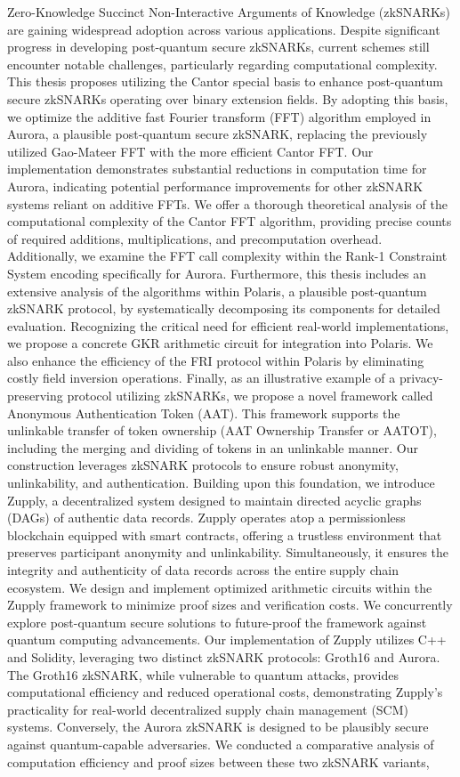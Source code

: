 Zero-Knowledge Succinct Non-Interactive Arguments of Knowledge (zkSNARKs) are gaining widespread adoption across various applications. Despite significant progress in developing post-quantum secure zkSNARKs, current schemes still encounter notable challenges, particularly regarding computational complexity.
This thesis proposes utilizing the Cantor special basis to enhance post-quantum secure zkSNARKs operating over binary extension fields. By adopting this basis, we optimize the additive fast Fourier transform (FFT) algorithm employed in Aurora, a plausible post-quantum secure zkSNARK, replacing the previously utilized Gao-Mateer FFT with the more efficient Cantor FFT. Our implementation demonstrates substantial reductions in computation time for Aurora, indicating potential performance improvements for other zkSNARK systems reliant on additive FFTs. We offer a thorough theoretical analysis of the computational complexity of the Cantor FFT algorithm, providing precise counts of required additions, multiplications, and precomputation overhead. Additionally, we examine the FFT call complexity within the Rank-1 Constraint System encoding specifically for Aurora.
Furthermore, this thesis includes an extensive analysis of the algorithms within Polaris, a plausible post-quantum zkSNARK protocol, by systematically decomposing its components for detailed evaluation. Recognizing the critical need for efficient real-world implementations, we propose a concrete GKR arithmetic circuit for integration into Polaris. We also enhance the efficiency of the FRI protocol within Polaris by eliminating costly field inversion operations.
Finally, as an illustrative example of a privacy-preserving protocol utilizing zkSNARKs, we propose a novel framework called Anonymous Authentication Token (AAT). This framework supports the unlinkable transfer of token ownership (AAT Ownership Transfer or AATOT), including the merging and dividing of tokens in an unlinkable manner. Our construction leverages zkSNARK protocols to ensure robust anonymity, unlinkability, and authentication. Building upon this foundation, we introduce Zupply, a decentralized system designed to maintain directed acyclic graphs (DAGs) of authentic data records. Zupply operates atop a permissionless blockchain equipped with smart contracts, offering a trustless environment that preserves participant anonymity and unlinkability. Simultaneously, it ensures the integrity and authenticity of data records across the entire supply chain ecosystem. We design and implement optimized arithmetic circuits within the Zupply framework to minimize proof sizes and verification costs. We concurrently explore post-quantum secure solutions to future-proof the framework against quantum computing advancements. Our implementation of Zupply utilizes C++ and Solidity, leveraging two distinct zkSNARK protocols: Groth16 and Aurora. The Groth16 zkSNARK, while vulnerable to quantum attacks, provides computational efficiency and reduced operational costs, demonstrating Zupply’s practicality for real-world decentralized supply chain management (SCM) systems. Conversely, the Aurora zkSNARK is designed to be plausibly secure against quantum-capable adversaries. We conducted a comparative analysis of computation efficiency and proof sizes between these two zkSNARK variants,
